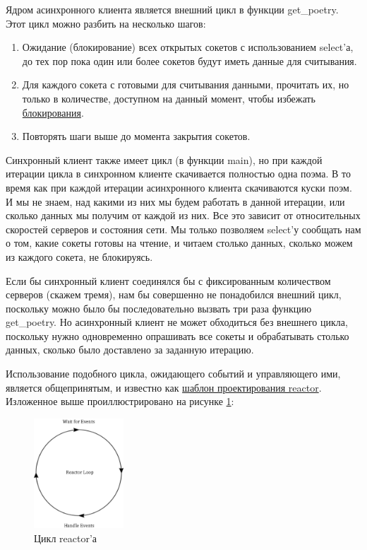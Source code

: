 Ядром асинхронного клиента является внешний цикл в 
функции get\_poetry. Этот цикл можно разбить на 
несколько шагов:

\begin{enumerate}
\item Ожидание (блокирование) всех открытых сокетов с использованием select'а, 
до тех пор пока один или более сокетов будут иметь данные для считывания. 
\item Для каждого сокета с готовыми для считывания данными, прочитать их, но только 
в количестве, доступном на данный момент, чтобы избежать 
\href{http://en.wikipedia.org/wiki/Asynchronous\_I/O}{блокирования}.
\item Повторять шаги выше до момента закрытия сокетов.
\end{enumerate}


Синхронный клиент также имеет цикл (в функции main), но 
при каждой итерации цикла в синхронном клиенте скачивается полностью 
одна поэма. В то время как при каждой итерации асинхронного 
клиента скачиваются куски поэм. И мы не знаем, 
над какими из них мы будем работать в данной итерации, или 
сколько данных мы получим от каждой из них. Все это зависит от 
относительных скоростей серверов и состояния сети. Мы только 
позволяем select'у сообщать нам о том, какие сокеты готовы на чтение, 
и читаем столько данных, сколько можем из каждого сокета, не блокируясь.


Если бы синхронный клиент соединялся бы 
с фиксированным количеством серверов (скажем тремя), 
нам бы совершенно не понадобился внешний цикл, поскольку 
можно было бы последовательно вызвать три раза 
функцию get\_poetry. Но асинхронный клиент не может 
обходиться без внешнего цикла, поскольку нужно одновременно 
опрашивать все сокеты и обрабатывать столько 
данных, сколько было доставлено за заданную итерацию. 


Использование подобного цикла, ожидающего событий и 
управляющего ими, является общепринятым, и известно как 
\href{http://en.wikipedia.org/wiki/Reactor\_pattern}{шаблон проектирования reactor}. 
Изложенное выше проиллюстрировано на рисунке \ref{fig:reactor-1}:

\begin{figure}[h]
\begin{center}
    \includegraphics[width=0.3\textwidth]{images/reactor-1.pdf}
\end{center}
    \caption{Цикл reactor'а\label{fig:reactor-1}}
\end{figure}

